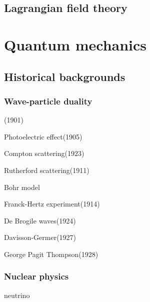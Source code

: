 \documentclass{../../large}
\begin{document}
\chapter{Lagrangian field theory}








\part{Quantum mechanics}

\chapter{Historical backgrounds}

\section{Wave-particle duality}
\begin{prb}
(1901)
\end{prb}
\begin{prb}
\item Photoelectric effect(1905)
\item Compton scattering(1923)
\end{prb}
\begin{prb}
\begin{parts}
\item Rutherford scattering(1911)
\item Bohr model
\item Franck-Hertz experiment(1914)
\item De Brogile waves(1924)
\end{parts}
\end{prb}
\begin{prb}
\begin{parts}
\item Davisson-Germer(1927)
\item George Pagit Thompson(1928)
\end{parts}
\end{prb}

\section{Nuclear physics}
neutrino
\end{document}
